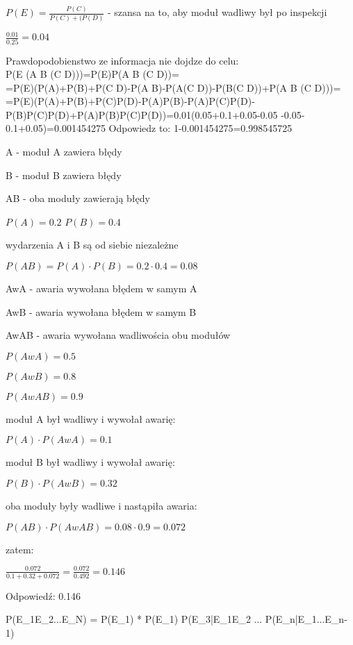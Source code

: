 \documentclass[fleqn]{article}
\begin{document}
$P(E) = \frac{P(C)}{P(C)+(P(D)}$ - szansa na to, aby moduł wadliwy był po inspekcji

$\frac{0.01}{0.25} = 0.04$


\medskip
{}
\medskip
Prawdopodobienstwo ze informacja nie dojdze do celu:\\
P(E \cap (A \cup B \cup (C \cap D)))=P(E)P(A \cup B \cup (C \cap D))=\\=P(E)(P(A)+P(B)+P(C \cap D)-P(A \cap B)-P(A\cap (C \cap D))-P(B\cap (C \cap D))+P(A \cap B \cap (C \cap D)))=\\=P(E)(P(A)+P(B)+P(C)P(D)-P(A)P(B)-P(A)P(C)P(D)-P(B)P(C)P(D)+P(A)P(B)P(C)P(D))=0.01\cdot (0.05+0.1+0.05-0.05 -0.05-0.1+0.05)=0.001454275
Odpowiedz to: 1-0.001454275=0.998545725
\newpage
\medskip
{}
\medskip

A - moduł A zawiera błędy

B - moduł B zawiera błędy

AB - oba moduły zawierają błędy

$P(A) = 0.2$
$P(B) = 0.4$

wydarzenia A i B są od siebie niezależne

$P(AB) = P(A) \cdot P(B) = 0.2 \cdot 0.4 = 0.08$

AwA - awaria wywołana błędem w samym A

AwB - awaria wywołana błędem w samym B

AwAB - awaria wywołana wadliwościa obu modułów

$P(AwA) = 0.5$

$P(AwB) = 0.8$

$P(AwAB) = 0.9$

moduł A był wadliwy i wywołał awarię:

$P(A) \cdot P(AwA) = 0.1$

moduł B był wadliwy i wywołał awarię:

$P(B) \cdot P(AwB) = 0.32$

oba moduły były wadliwe i nastąpiła awaria:

$ P(AB) \cdot P(AwAB) = 0.08 \cdot 0.9 = 0.072$

zatem:

$\frac{0.072}{0.1 + 0.32 + 0.072} = \frac{0.072}{0.492} = 0.146$

Odpowiedź: 0.146

\medskip




P(E_{1}E_{2}...E_{N}) = P(E_{1}) * P(E_{1}) \cdot P(E_{3}|E_{1}E_{2} \cdot ... \cdot P(E_{n}|E_{1}...E_{n-1})

\medskip
\end{document}
